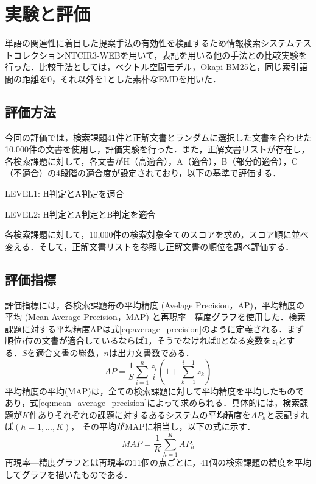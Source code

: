 \documentclass[japanese]{jnlp_1.4}
\begin{document}
\section{実験と評価}

単語の関連性に着目した提案手法の有効性を検証するため情報検索システムテストコレクションNTCIR3-WEBを用いて，表記を用いる他の手法との比較実験を行った．比較手法としては，ベクトル空間モデル，Okapi BM25と，同じ索引語間の距離を0，それ以外を1とした素朴なEMDを用いた．


\subsection{評価方法}
\label{evaluation method}

今回の評価では，検索課題41件と正解文書とランダムに選択した文書を合わせた10,000件の文書を使用し，評価実験を行った．また，正解文書リストが存在し，各検索課題に対して，各文書がH（高適合），A（適合），B（部分的適合），C（不適合）の4段階の適合度が設定されており，以下の基準で評価する．

LEVEL1: H判定とA判定を適合

LEVEL2: H判定とA判定とB判定を適合

各検索課題に対して，10,000件の検索対象全てのスコアを求め，スコア順に並べ変える．そして，正解文書リストを参照し正解文書の順位を調べ評価する．


\subsection{評価指標}

評価指標には，各検索課題毎の平均精度 (Avelage Precision，AP)，平均精度の平均 (Mean Average Precision，MAP) と再現率—精度グラフを使用した．検索課題に対する平均精度APは式\ref{eq:average_precision}のように定義される．まず順位$i$位の文書が適合しているならば1，そうでなければ0となる変数を$z_i$とする．$S$を適合文書の総数，$n$は出力文書数である．
\begin{equation}\label{eq:average_precision}
 AP=\frac{1}{S}\sum_{i=1}^{n} \frac{z_i}{i}\left( 1+\sum_{k=1}^{i-1} z_k \right)
\end{equation}
平均精度の平均(MAP)は，全ての検索課題に対して平均精度を平均したものであり，式\ref{eq:mean_average_precision}によって求められる．具体的には，検索課題が$K$件ありそれぞれの課題に対するあるシステムの平均精度を$AP_h$と表記すれば$(h=1,...,K)$，
\pagebreak
その平均がMAPに相当し，以下の式に示す．
\begin{equation}\label{eq:mean_average_precision}
 MAP=\frac{1}{K}\sum_{h=1}^{K}AP_h
\end{equation}
再現率—精度グラフとは再現率の11個の点ごとに，41個の検索課題の精度を平均してグラフを描いたものである．
\end{document}
